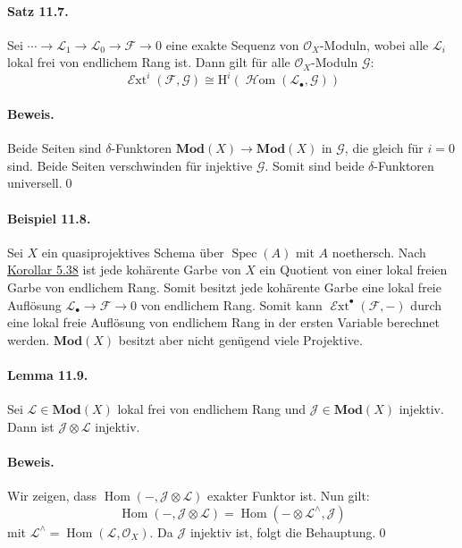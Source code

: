 \paragraph{Satz 11.7.}\label{11.7} Sei $\cdots\to\mathcal{L}_1\to\mathcal{L}_0\to\mathcal{F}\to 0$ eine exakte Sequenz von $\mathcal{O}_X$-Moduln, wobei alle $\mathcal{L}_i$ lokal frei von endlichem Rang ist. Dann gilt für alle $\mathcal{O}_X$-Moduln $\mathcal{G}$:
\[\operatorname{\mathcal{E}xt}^i(\mathcal{F},\mathcal{G})\cong \mathrm{H}^i(\operatorname{\mathcal{H}om}(\mathcal{L}_\bullet,\mathcal{G})) \]

\paragraph{Beweis.} Beide Seiten sind $\delta$-Funktoren $\mathbf{Mod}(X)\to\mathbf{Mod}(X)$ in $\mathcal{G}$, die gleich für $i=0$ sind. Beide Seiten verschwinden für injektive $\mathcal{G}$. Somit sind beide $\delta$-Funktoren universell.\qed

\paragraph{Beispiel 11.8.}\label{11.8} Sei $X$ ein quasiprojektives Schema über $\operatorname{Spec}(A)$ mit $A$ noethersch. Nach \hyperref[5.38]{Korollar 5.38} ist jede kohärente Garbe von $X$ ein Quotient von einer lokal freien Garbe von endlichem Rang. Somit besitzt jede kohärente Garbe eine lokal freie Auflösung $\mathcal{L}_\bullet\to\mathcal{F}\to 0$ von endlichem Rang. Somit kann $\operatorname{\mathcal{E}xt}^\bullet(\mathcal{F},-)$ durch eine lokal freie Auflösung von endlichem Rang in der ersten Variable berechnet werden. $\mathbf{Mod}(X)$ besitzt aber nicht genügend viele Projektive.

\paragraph{Lemma 11.9.}\label{11.9} Sei $\mathcal{L}\in\mathbf{Mod}(X)$ lokal frei von endlichem Rang und $\mathcal{J}\in\mathbf{Mod}(X)$ injektiv. Dann ist $\mathcal{J}\otimes\mathcal{L}$ injektiv.

\paragraph{Beweis.} Wir zeigen, dass $\operatorname{Hom}(-,\mathcal{J}\otimes\mathcal{L})$ exakter Funktor ist. Nun gilt:
\[\operatorname{Hom}(-,\mathcal{J}\otimes\mathcal{L})=\operatorname{Hom}(-\otimes\mathcal{L}^\wedge,\mathcal{J})\]
mit $\mathcal{L}^\wedge =\operatorname{Hom}(\mathcal{L},\mathcal{O}_X)$. Da $\mathcal{J}$ injektiv ist, folgt die Behauptung.\qed

